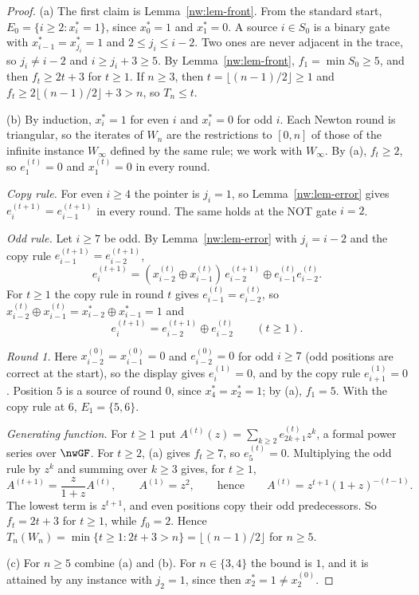 \documentclass[11pt]{amsart}
\theoremstyle{definition}
\theoremstyle{remark}
\begin{document}
\begin{proof}
(a) The first claim is Lemma~\ref{nw:lem-front}. From the standard start,
$E_0=\{i\ge2:x^*_i=1\}$, since $x^*_0=1$ and $x^*_1=0$. A source $i\in S_0$ is
a binary gate with $x^*_{i-1}=x^*_{j_i}=1$ and $2\le j_i\le i-2$. Two ones are
never adjacent in the trace, so $j_i\ne i-2$ and $i\ge j_i+3\ge5$. By
Lemma~\ref{nw:lem-front}, $f_1=\min S_0\ge5$, and then $f_t\ge2t+3$ for
$t\ge1$. If $n\ge3$, then $t=\lfloor(n-1)/2\rfloor\ge1$ and
$f_t\ge2\lfloor(n-1)/2\rfloor+3>n$, so $T_n\le t$.

(b) By induction, $x^*_i=1$ for even $i$ and $x^*_i=0$ for odd $i$. Each
Newton round is triangular, so the iterates of $W_n$ are the restrictions to
$[0,n]$ of those of the infinite instance $W_\infty$ defined by the same rule;
we work with $W_\infty$. By (a), $f_t\ge2$, so $e^{(t)}_1=0$ and
$x^{(t)}_1=0$ in every round.

\emph{Copy rule.} For even $i\ge4$ the pointer is $j_i=1$, so
Lemma~\ref{nw:lem-error} gives $e^{(t+1)}_i=e^{(t+1)}_{i-1}$ in every round.
The same holds at the NOT gate $i=2$.

\emph{Odd rule.} Let $i\ge7$ be odd. By Lemma~\ref{nw:lem-error} with
$j_i=i-2$ and the copy rule $e^{(t+1)}_{i-1}=e^{(t+1)}_{i-2}$,
\[
  e^{(t+1)}_i=(x^{(t)}_{i-2}\oplus x^{(t)}_{i-1})\,e^{(t+1)}_{i-2}
  \oplus e^{(t)}_{i-1}e^{(t)}_{i-2}.
\]
For $t\ge1$ the copy rule in round $t$ gives $e^{(t)}_{i-1}=e^{(t)}_{i-2}$, so
$x^{(t)}_{i-2}\oplus x^{(t)}_{i-1}=x^*_{i-2}\oplus x^*_{i-1}=1$ and
\[
  e^{(t+1)}_i=e^{(t+1)}_{i-2}\oplus e^{(t)}_{i-2}\qquad(t\ge1).
\]

\emph{Round 1.} Here $x^{(0)}_{i-2}=x^{(0)}_{i-1}=0$ and $e^{(0)}_{i-2}=0$ for
odd $i\ge7$ (odd positions are correct at the start), so the display gives
$e^{(1)}_i=0$, and by the copy rule $e^{(1)}_{i+1}=0$. Position $5$ is a
source of round $0$, since $x^*_4=x^*_2=1$; by (a), $f_1=5$. With the copy
rule at $6$, $E_1=\{5,6\}$.

\emph{Generating function.} For $t\ge1$ put
$A^{(t)}(z)=\sum_{k\ge2}e^{(t)}_{2k+1}z^k$, a formal power series over
$\nwGF$. For $t\ge2$, (a) gives $f_t\ge7$, so $e^{(t)}_5=0$. Multiplying the
odd rule by $z^k$ and summing over $k\ge3$ gives, for $t\ge1$,
\[
  A^{(t+1)}=\frac{z}{1+z}A^{(t)},\qquad A^{(1)}=z^2,\qquad\text{hence}\qquad
  A^{(t)}=z^{t+1}(1+z)^{-(t-1)}.
\]
The lowest term is $z^{t+1}$, and even positions copy their odd predecessors.
So $f_t=2t+3$ for $t\ge1$, while $f_0=2$. Hence
$T_n(W_n)=\min\{t\ge1:2t+3>n\}=\lfloor(n-1)/2\rfloor$ for $n\ge5$.

(c) For $n\ge5$ combine (a) and (b). For $n\in\{3,4\}$ the bound is $1$, and
it is attained by any instance with $j_2=1$, since then
$x^*_2=1\ne x^{(0)}_2$.
\end{proof}
\end{document}

